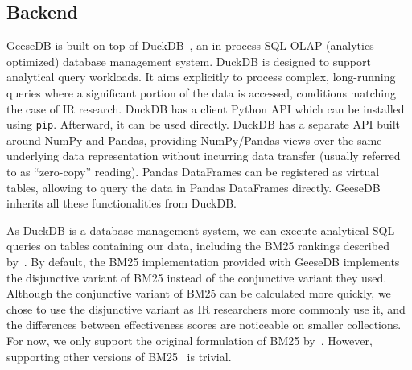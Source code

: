 \subsection{Backend}
GeeseDB is built on top of DuckDB~\citep{duckdb}, an in-process SQL OLAP (analytics optimized) database management system. DuckDB is designed to support analytical query workloads. It aims explicitly to process complex, long-running queries where a significant portion of the data is accessed, conditions matching the case of IR research. DuckDB has a client Python API which can be installed using \texttt{pip}. Afterward, it can be used directly. DuckDB has a separate API built around NumPy and Pandas, providing NumPy/Pandas views over the same underlying data representation without incurring data transfer (usually referred to as ``zero-copy'' reading). Pandas DataFrames can be registered as virtual tables, allowing to query the data in Pandas DataFrames directly. GeeseDB inherits all these functionalities from DuckDB.

As DuckDB is a database management system, we can execute analytical SQL queries on tables containing our data, including the BM25 rankings described by~\citet{OldDog}. By default, the BM25 implementation provided with GeeseDB implements the disjunctive variant of BM25 instead of the conjunctive variant they used. Although the conjunctive variant of BM25 can be calculated more quickly, we chose to use the disjunctive variant as IR researchers more commonly use it, and the differences between effectiveness scores are noticeable on smaller collections. For now, we only support the original formulation of BM25 by~\citet{bm25-robertson}. However, supporting other versions of BM25~\citep{Kamphuis2020BM25} is trivial.

